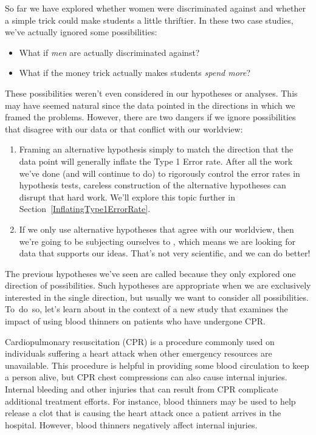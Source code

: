 So far we have explored whether women were discriminated against and whether a simple trick could make students a little thriftier. In these two case studies, we've actually ignored some possibilities:
\begin{itemize}
\item What if \emph{men} are actually discriminated against?
\item What if the money trick actually makes students \emph{spend more}?
\end{itemize}
These possibilities weren't even considered in our hypotheses or analyses. This may have seemed natural since the data pointed in the directions in which we framed the problems. However, there are two dangers if we ignore possibilities that disagree with our data or that conflict with our worldview:
\begin{enumerate}
\item Framing an alternative hypothesis simply to match the direction that the data point will generally inflate the Type 1 Error rate. After all the work we've done (and will continue to do) to rigorously control the error rates in hypothesis tests, careless construction of the alternative hypotheses can disrupt that hard work. We'll explore this topic further in Section~\ref{InflatingType1ErrorRate}.
\item If we only use alternative hypotheses that agree with our worldview, then we're going to be subjecting ourselves to , which means we are looking for data that supports our ideas. That's not very scientific, and we can do better!
\end{enumerate}
The previous hypotheses we've seen are called  because they only explored one direction of possibilities. Such hypotheses are appropriate when we are exclusively interested in the single direction, but usually we want to consider all possibilities. To~do~so, let's learn about  in the context of a new study that examines the impact of using blood thinners on patients who have undergone CPR.


Cardiopulmonary resuscitation (CPR) is a procedure commonly used on individuals suffering a heart attack when other emergency resources are unavailable. This procedure is helpful in providing some blood circulation to keep a person alive, but CPR chest compressions can also cause internal injuries. Internal bleeding and other injuries that can result from CPR complicate additional treatment efforts. For instance, blood thinners may be used to help release a clot that is causing the heart attack once a patient arrives in the hospital. However, blood thinners negatively affect internal injuries.

